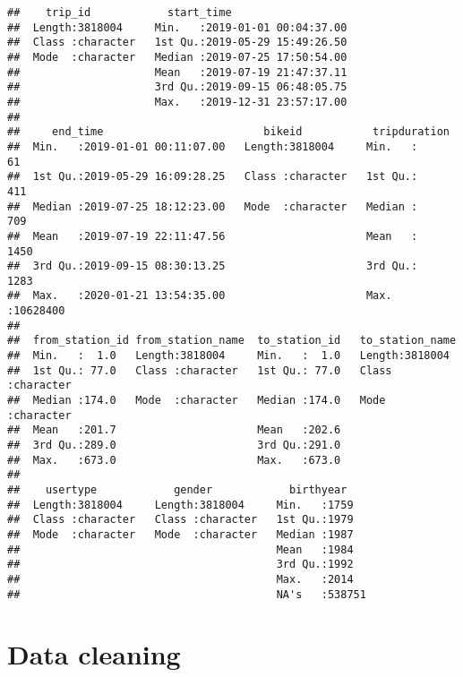 \documentclass[
]{article}
\begin{document}
\begin{verbatim}
##    trip_id            start_time                    
##  Length:3818004     Min.   :2019-01-01 00:04:37.00  
##  Class :character   1st Qu.:2019-05-29 15:49:26.50  
##  Mode  :character   Median :2019-07-25 17:50:54.00  
##                     Mean   :2019-07-19 21:47:37.11  
##                     3rd Qu.:2019-09-15 06:48:05.75  
##                     Max.   :2019-12-31 23:57:17.00  
##                                                     
##     end_time                         bikeid           tripduration     
##  Min.   :2019-01-01 00:11:07.00   Length:3818004     Min.   :      61  
##  1st Qu.:2019-05-29 16:09:28.25   Class :character   1st Qu.:     411  
##  Median :2019-07-25 18:12:23.00   Mode  :character   Median :     709  
##  Mean   :2019-07-19 22:11:47.56                      Mean   :    1450  
##  3rd Qu.:2019-09-15 08:30:13.25                      3rd Qu.:    1283  
##  Max.   :2020-01-21 13:54:35.00                      Max.   :10628400  
##                                                                        
##  from_station_id from_station_name  to_station_id   to_station_name   
##  Min.   :  1.0   Length:3818004     Min.   :  1.0   Length:3818004    
##  1st Qu.: 77.0   Class :character   1st Qu.: 77.0   Class :character  
##  Median :174.0   Mode  :character   Median :174.0   Mode  :character  
##  Mean   :201.7                      Mean   :202.6                     
##  3rd Qu.:289.0                      3rd Qu.:291.0                     
##  Max.   :673.0                      Max.   :673.0                     
##                                                                       
##    usertype            gender            birthyear     
##  Length:3818004     Length:3818004     Min.   :1759    
##  Class :character   Class :character   1st Qu.:1979    
##  Mode  :character   Mode  :character   Median :1987    
##                                        Mean   :1984    
##                                        3rd Qu.:1992    
##                                        Max.   :2014    
##                                        NA's   :538751
\end{verbatim}

\hypertarget{data-cleaning}{%
\section{Data cleaning}\label{data-cleaning}}
\end{document}
